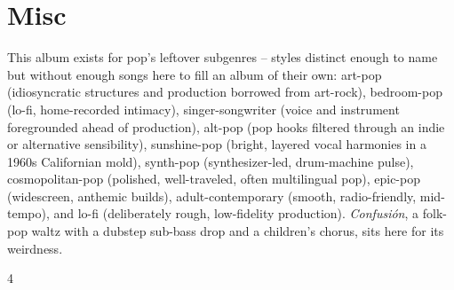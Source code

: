 \documentclass[a4paper,landscape]{memoir}
\begin{document}
\chapter{Misc}
This album exists for pop's leftover subgenres -- styles distinct enough to name but without enough songs here to fill an album of their own: art-pop (idiosyncratic structures and production borrowed from art-rock), bedroom-pop (lo-fi, home-recorded intimacy), singer-songwriter (voice and instrument foregrounded ahead of production), alt-pop (pop hooks filtered through an indie or alternative sensibility), sunshine-pop (bright, layered vocal harmonies in a 1960s Californian mold), synth-pop (synthesizer-led, drum-machine pulse), cosmopolitan-pop (polished, well-traveled, often multilingual pop), epic-pop (widescreen, anthemic builds), adult-contemporary (smooth, radio-friendly, mid-tempo), and lo-fi (deliberately rough, low-fidelity production). \emph{Confusión}, a folk-pop waltz with a dubstep sub-bass drop and a children’s chorus, sits here for its weirdness.
\clearpage\begin{multicols*}{4}
\end{multicols*}

\appendix

\backmatter
\printindex[songs]
\clearpage
\printindex[tags]
\end{document}
